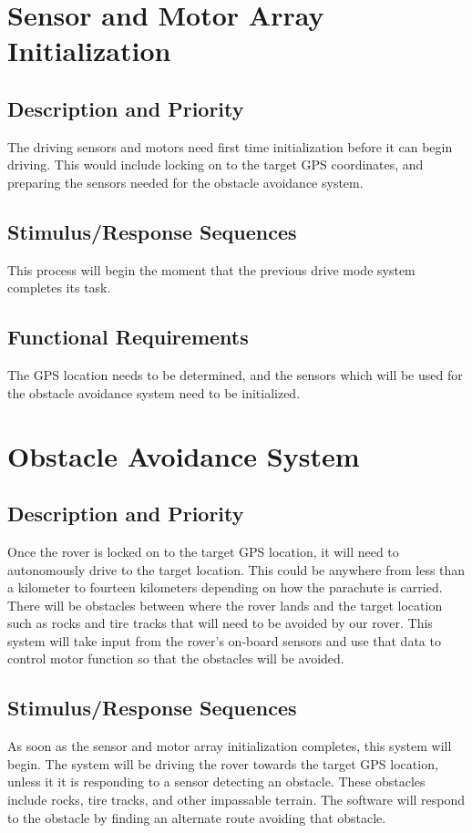 \documentclass{scrreprt}
\begin{document}
\section{Sensor and Motor Array Initialization}

\subsection{Description and Priority}
The driving sensors and motors need first time initialization before it can begin driving. This would include locking on to the target GPS coordinates, and preparing the sensors needed for the obstacle avoidance system.


\subsection{Stimulus/Response Sequences}
This process will begin the moment that the previous drive mode system completes its task. 

\subsection{Functional Requirements}
The GPS location needs to be determined, and the sensors which will be used for the obstacle avoidance system need to be initialized. 

\section{Obstacle Avoidance System}

\subsection{Description and Priority}
Once the rover is locked on to the target GPS location, it will need to autonomously drive to the target location. This could be anywhere from less than a kilometer to fourteen kilometers depending on how the parachute is carried. There will be obstacles between where the rover lands and the target location such as rocks and tire tracks that will need to be avoided by our rover. This system will take input from the rover's on-board sensors and use that data to control motor function so that the obstacles will be avoided.


\subsection{Stimulus/Response Sequences}
As soon as the sensor and motor array initialization completes, this system will begin. The system will be driving the rover towards the target GPS location, unless it it is responding to a sensor detecting an obstacle. These obstacles include rocks, tire tracks, and other impassable terrain. The software will respond to the obstacle by finding an alternate route avoiding that obstacle. 
\end{document}
